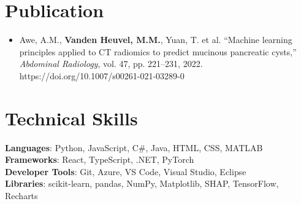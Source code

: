 \documentclass[letterpaper,11pt]{article}
\newcommand{\resumeItem}[1]{
  \item\small{
    {#1 \vspace{-2pt}}
  }
}
\newcommand{\resumeItemListStart}{\begin{itemize}}
\newcommand{\resumeItemListEnd}{\end{itemize}\vspace{-5pt}}
\begin{document}
\section{Publication}
  \resumeItemListStart
      \resumeItem{Awe, A.M., \textbf{Vanden Heuvel, M.M.}, Yuan, T. et al. ``Machine learning principles applied to CT radiomics to predict mucinous pancreatic cysts,'' \textit{Abdominal Radiology}, vol. 47, pp. 221–231, 2022. https://doi.org/10.1007/s00261-021-03289-0}
  \resumeItemListEnd

\section{Technical Skills}
 \begin{itemize}[leftmargin=0.15in, label={}]
    \small{\item{
     \textbf{Languages}{: Python, JavaScript, C\#, Java, HTML, CSS, MATLAB} \\
     \textbf{Frameworks}{: React, TypeScript, .NET, PyTorch} \\
     \textbf{Developer Tools}{: Git, Azure, VS Code, Visual Studio, Eclipse} \\
     \textbf{Libraries}{: scikit-learn, pandas, NumPy, Matplotlib, SHAP, TensorFlow, Recharts}
    }}
 \end{itemize}


\end{document}
